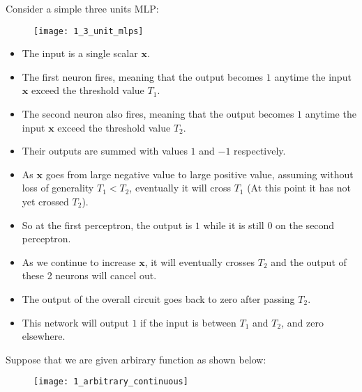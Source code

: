 \hfill\break
Consider a simple three units MLP:
\begin{figure}[H]
	\centering
	\texttt{[image: 1\_3\_unit\_mlps]}
\end{figure}

\begin{itemize}
	\item The input is a single scalar $\mathbf{x}$.
	\item The first neuron fires, meaning that the output becomes $1$ anytime the input $\mathbf{x}$ exceed the threshold value $T_1$.
	\item The second neuron also fires, meaning that the output becomes $1$ anytime the input $\mathbf{x}$ exceed the threshold value $T_2$.
	\item Their outputs are summed with values $1$ and $-1$ respectively.
	\item As $\mathbf{x}$ goes from large negative value to large positive value, assuming without loss of generality $T_1 < T_2$, eventually it will cross $T_1$ (At this point it has not yet crossed $T_2$).
	\item So at the first perceptron, the output is $1$ while it is still $0$ on the second perceptron.
	\item As we continue to increase $\mathbf{x}$, it will eventually crosses $T_2$ and the output of these 2 neurons will cancel out.
	\item The output of the overall circuit goes back to zero after passing $T_2$.
	\item This network will output $1$ if the input is between $T_1$ and $T_2$, and zero elsewhere.
\end{itemize}

\hfill\break
Suppose that we are given arbirary function as shown below:
\begin{figure}[H]
	\centering
	\texttt{[image: 1\_arbitrary\_continuous]}
\end{figure}

